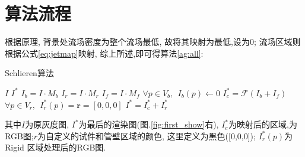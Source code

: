 \section{算法流程}
根据原理, 背景处流场密度为整个流场最低, 故将其映射为最低,设为0; 流场区域则根据公式\ref{eq:jetmap}映射, 综上所述,即可得算法\ref{ag:all}:


\begin{algorithm}[h]  
    \caption{Schlieren算法}  
    \label{alg:Framwork}  
    \begin{algorithmic}[1]  
      \Require  
      $I$
      \Ensure  
     $I^*$
     \State $I_b = I\cdot M_b$
     \State $I_r = I\cdot M_r$
     \State $I_f = I\cdot M_f$
     \State $\forall p \in V_b,~~I_b(p) \leftarrow 0$
     \State $I^*_c = \mathcal{F}(I_b + I_f)$
     \State $\forall p \in V_r,~~I^*_r(p) = \textbf{r} = [0,0,0]$
     \State $I^* = I^*_c + I^*_r$
    \end{algorithmic}  
    \label{ag:all}
  \end{algorithm}
其中$I$为原灰度图, $I^*$为最后的渲染图(图.\ref{fig:first_show}右), $I^*_c$为映射后的区域,为RGB图;$r$为自定义的试件和管壁区域的颜色, 这里定义为黑色([0,0,0]); $I^*_r(p)$为Rigid 区域处理后的RGB图.